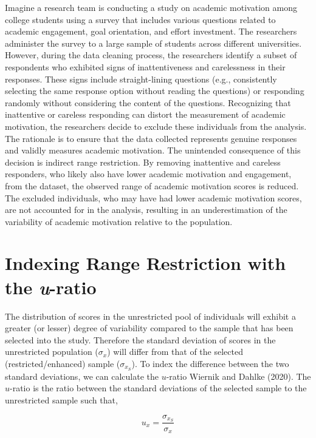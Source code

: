 \documentclass[
  letterpaper,
  DIV=11,
  numbers=noendperiod]{scrreprt}
\begin{document}
Imagine a research team is conducting a study on academic motivation
among college students using a survey that includes various questions
related to academic engagement, goal orientation, and effort investment.
The researchers administer the survey to a large sample of students
across different universities. However, during the data cleaning
process, the researchers identify a subset of respondents who exhibited
signs of inattentiveness and carelessness in their responses. These
signs include straight-lining questions (e.g., consistently selecting
the same response option without reading the questions) or responding
randomly without considering the content of the questions. Recognizing
that inattentive or careless responding can distort the measurement of
academic motivation, the researchers decide to exclude these individuals
from the analysis. The rationale is to ensure that the data collected
represents genuine responses and validly measures academic motivation.
The unintended consequence of this decision is indirect range
restriction. By removing inattentive and careless responders, who likely
also have lower academic motivation and engagement, from the dataset,
the observed range of academic motivation scores is reduced. The
excluded individuals, who may have had lower academic motivation scores,
are not accounted for in the analysis, resulting in an underestimation
of the variability of academic motivation relative to the population.

\hypertarget{indexing-range-restriction-with-the-u-ratio-1}{%
\section{\texorpdfstring{Indexing Range Restriction with the
\emph{u}-ratio}{Indexing Range Restriction with the u-ratio}}\label{indexing-range-restriction-with-the-u-ratio-1}}

The distribution of scores in the unrestricted pool of individuals will
exhibit a greater (or lesser) degree of variability compared to the
sample that has been selected into the study. Therefore the standard
deviation of scores in the unrestricted population (\(\sigma_x\)) will
differ from that of the selected (restricted/enhanced) sample
(\(\sigma_{x_{S}}\)). To index the difference between the two standard
deviations, we can calculate the \(u\)-ratio Wiernik and Dahlke (2020).
The \(u\)-ratio is the ratio between the standard deviations of the
selected sample to the unrestricted sample such that,

\[
u_x = \frac{\sigma_{x_S}}{\sigma_x}
\]
\end{document}
